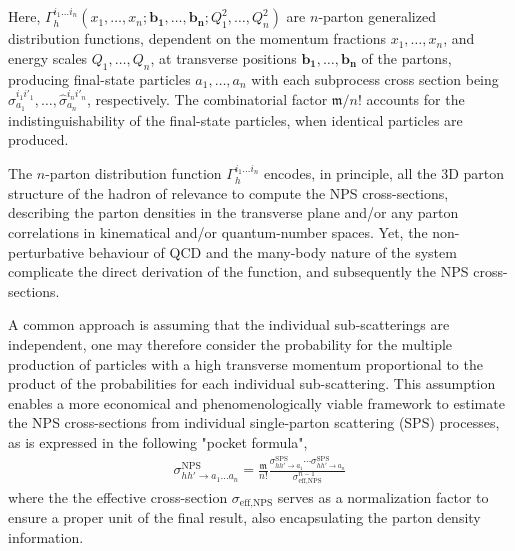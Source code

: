 \documentclass[10pt,twocolumn]{article}
\newcommand*{\effXsecNPS}{\sigma_{\text{eff,NPS}}}
\begin{document}
Here, $\Gamma_h^{i_1\dots i_n}(x_1,\dots,x_n;\mathbf{b_1},\dots,\mathbf{b_n};Q_1^2,\dots,Q_n^2)$ are $n$-parton generalized distribution functions, dependent on the momentum fractions $x_1, \dots, x_n$, and energy scales $Q_1,\dots,Q_n$, at transverse positions $\mathbf{b_1}, \dots, \mathbf{b_n}$ of the partons, producing final-state particles $a_1, \dots, a_n$ with each subprocess cross section being $\hat{\sigma}_{a_1}^{i_1i'_1}, \dots, \hat{\sigma}_{a_n}^{i_ni'_n}$, respectively.
The combinatorial factor $\mathfrak{m}/n!$ accounts for the indistinguishability of the final-state particles, when identical particles are produced.

The $n$-parton distribution function $\Gamma_h^{i_1\dots i_n}$ encodes, in principle, all the 3D parton structure of the hadron of relevance to compute the NPS cross-sections, describing the parton densities in the transverse plane and/or any parton correlations in kinematical and/or quantum-number spaces.
Yet, the non-perturbative behaviour of QCD and the many-body nature of the system complicate the direct derivation of the function, and subsequently the NPS cross-sections.

A common approach is assuming that the individual sub-scatterings are independent, one may therefore consider the probability for the multiple production of particles with a high transverse momentum proportional to the product of the probabilities for each individual sub-scattering.
This assumption enables a more economical and phenomenologically viable framework to estimate the NPS cross-sections from individual single-parton scattering (SPS) processes, as is expressed in the following "pocket formula",
\begin{equation}
\begin{aligned}
    \label{eqn:nps_pocket}
    \sigma_{hh'\to a_1\dots a_n}^{\text{NPS}}
    =
    \frac{\mathfrak{m}}{n!} \frac{\sigma_{hh'\to a_1}^{\text{SPS}}\cdots \sigma_{hh'\to a_n}^{\text{SPS}}}{\effXsecNPS^{n-1}}
\end{aligned}
\end{equation}
where the the effective cross-section $\sigma_{\text{eff,NPS}}$ serves as a normalization factor to ensure a proper unit of the final result, also encapsulating the parton density information.
\end{document}
